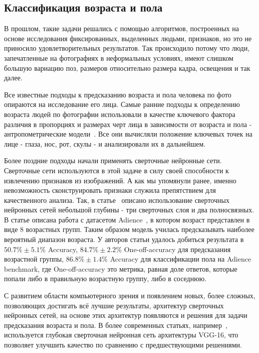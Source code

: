 \subsection{Классификация возраста и пола}\label{subsec:классификация-возраста-и-пола}
\par В прошлом, такие задачи решались с помощью алгоритмов, построенных на основе исследования фиксированных, выделенных людьми, признаков,
но это не приносило удовлетворительных результатов.
Так происходило потому что люди, запечатленные на фотографиях в неформальных условиях,
имеют слишком большую вариацию поз, размеров относительно размера кадра, освещения и так далее.
\par Все известные подходы к предсказанию возраста и пола человека по фото опираются на исследование его лица.
Самые ранние подходы к определению возраста людей по фотографии
использовали в качестве ключевого фактора различия в пропорциях и размерах черт лица в зависимости от возраста и пола -
антропометрические модели~\cite{age1994}.
Все они вычисляли положение ключевых точек на лице - глаза, нос, рот, скулы - и анализировали их в дальнейшем.
\par Более поздние подходы начали применять сверточные нейронные сети.
Сверточные сети используются в этой задаче в силу своей способности к извлечению признаков из изображений.
А как мы упомянули ранее, именно невозможность сконструировать признаки служила препятствием для качественного анализа.
Так, в статье~\cite{hassner} описано использование сверточных нейронных сетей небольшой глубины -
три сверточных слоя и два полносвязных.
В статье описана работа с датасетом Adience~\cite{adience}, в котором возраст представлен в виде 8 возрастных групп.
Таким образом модель училась предсказывать наиболее вероятный диапазон возраста.
У авторов статьи удалось добиться результата в $50.7\% \pm 5.1 \%$ Accuracy, $84.7\% \pm 2.2\%$ One-off-accuracy для предсказания возрастной группы,
$86.8\% \pm 1.4 \%$ Accuracy для классификации пола на Adience benchmark, где One-off-accuracy это метрика,
равная доле ответов, которые попали либо в правильную возрастную группу, либо в соседнюю.
\par С развитием области компьютерного зрения и появлением новых, более сложных, позволяющих достигать всё лучшие результаты,
архитектур сверточных нейронных сетей, на основе этих архитектур появляются и решения для задачи предсказания возраста и пола.
В более современных статьях, например~\cite{imdb}, используется глубокая сверточная нейронная сеть архитектуры VGG-16,
что позволяет улучшить качество по сравнению с предшествующими решениями.
